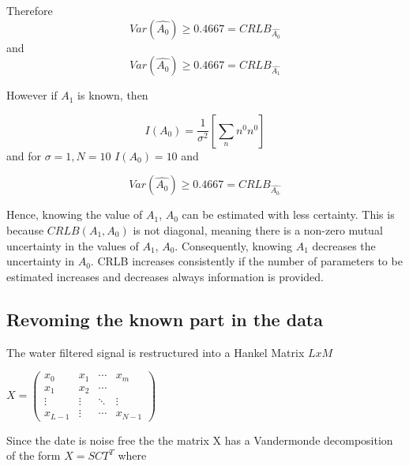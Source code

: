 Therefore
\begin{equation}
Var(\hat{A_{0}})\geq 0.4667=CRLB_{\hat{A_{0}}}   
\end{equation}
and
\begin{equation}
Var(\hat{A_{0}})\geq 0.4667=CRLB_{\hat{A_{1}}}
\end{equation}

However if $A_{1}$ is known, then 

\begin{equation}
I(A_{0})=\frac{1}{\sigma^2}[\sum_{n}n^{0}n^{0}]
\end{equation}
and for $\sigma=1,N=10$ $I(A_{0})=10$ and 

\begin{equation}
Var(\hat{A_{0}})\geq 0.4667=CRLB_{\hat{A_{0_{'}}}}
\end{equation}

Hence, knowing the value of $A_{1}$, $A_{0}$ can be estimated with less certainty. This is because $CRLB(A_{1}, A_{0})$ is not diagonal, meaning there is a non-zero mutual uncertainty in the values of $A_{1}$, $A_{0}$. Consequently, knowing $A_{1}$ decreases the uncertainty in $A_{0}$. CRLB increases consistently if the number of parameters to be estimated increases and decreases always information is provided.



\newpage
\subsection{Revoming the known part in the data}\label{Ap3}

The water filtered signal is restructured into a Hankel Matrix $LxM$ 

$X= 
 \begin{pmatrix}
  x_{0} & x_{1} & \cdots & x_{m} \\
  x_{1} & x_{2} & \cdots &   \\
  \vdots  & \vdots  & \ddots & \vdots  \\
  x_{L-1} & \vdots & \cdots & x_{N-1} 
 \end{pmatrix}$

Since the date is noise free the the matrix X has a Vandermonde decomposition of the form $X=SCT^{T}$ where


